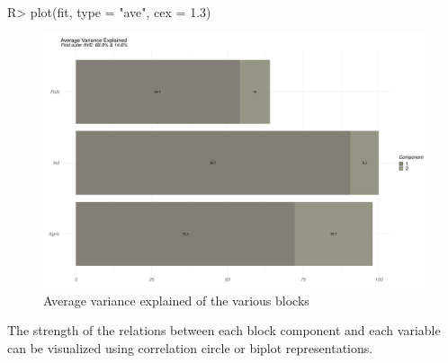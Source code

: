 \documentclass[
]{jss}
\begin{document}
\begin{CodeChunk}
\begin{CodeInput}
R> plot(fit, type = "ave", cex = 1.3)
\end{CodeInput}
\begin{figure}[H]

{\centering \includegraphics{RGCCA_vignette_files/figure-latex/unnamed-chunk-9-1} 

}

\caption[Average variance explained of the various blocks]{Average variance explained of the various blocks}\label{fig:unnamed-chunk-9}
\end{figure}
\end{CodeChunk}

\normalsize

The strength of the relations between each block component and each
variable can be visualized using correlation circle or biplot
representations.

\footnotesize
\end{document}
